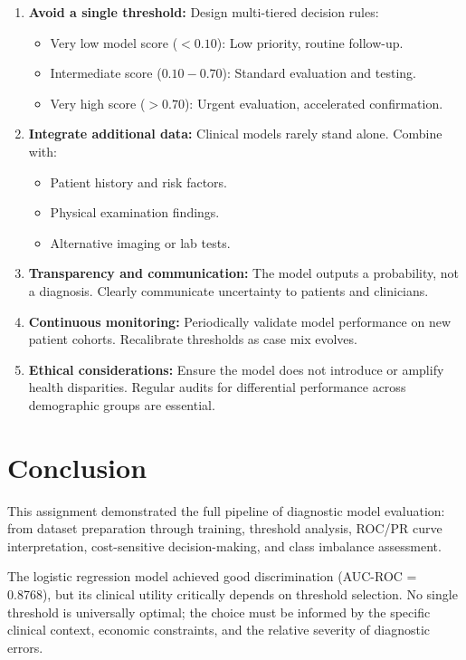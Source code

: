 \documentclass[11pt]{article}
\begin{document}
\begin{enumerate}
    \item \textbf{Avoid a single threshold:} Design multi-tiered decision rules:
    \begin{itemize}
        \item Very low model score ($< 0.10$): Low priority, routine follow-up.
        \item Intermediate score ($0.10-0.70$): Standard evaluation and testing.
        \item Very high score ($> 0.70$): Urgent evaluation, accelerated confirmation.
    \end{itemize}
    
    \item \textbf{Integrate additional data:} Clinical models rarely stand alone. Combine with:
    \begin{itemize}
        \item Patient history and risk factors.
        \item Physical examination findings.
        \item Alternative imaging or lab tests.
    \end{itemize}
    
    \item \textbf{Transparency and communication:} The model outputs a probability, not a diagnosis. Clearly communicate uncertainty to patients and clinicians.
    
    \item \textbf{Continuous monitoring:} Periodically validate model performance on new patient cohorts. Recalibrate thresholds as case mix evolves.
    
    \item \textbf{Ethical considerations:} Ensure the model does not introduce or amplify health disparities. Regular audits for differential performance across demographic groups are essential.
\end{enumerate}

\section{Conclusion}

This assignment demonstrated the full pipeline of diagnostic model evaluation: from dataset preparation through training, threshold analysis, ROC/PR curve interpretation, cost-sensitive decision-making, and class imbalance assessment. 

The logistic regression model achieved good discrimination (AUC-ROC = 0.8768), but its clinical utility critically depends on threshold selection. No single threshold is universally optimal; the choice must be informed by the specific clinical context, economic constraints, and the relative severity of diagnostic errors.
\end{document}
